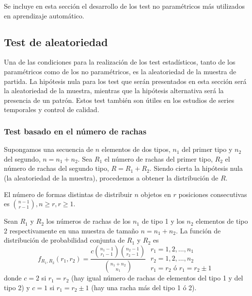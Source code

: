  	Se incluye en esta sección el desarrollo de los test no paramétricos más utilizados en aprendizaje automático.
 	
 	
\subsection{Test de aleatoriedad}

	Una de las condiciones para la realización de los test estadísticos, tanto de los paramétricos como de los no paramétricos, es la aleatoriedad de la muestra de partida. La hipótesis nula para los test que serán presentados en esta sección será la aleatoriedad de la muestra, mientras que la hipótesis alternativa será la presencia de un patrón. Estos test también son útiles en los estudios de series temporales y control de calidad.
	
\subsubsection{Test basado en el número de rachas}

	Supongamos una secuencia de $n$ elementos de dos tipos, $n_1$ del primer tipo y $n_2$ del segundo, $n = n_1 + n_2$. Sea $R_1$ el número de rachas del primer tipo, $R_2$ el número de rachas del segundo tipo, $R = R_1 + R_2$. Siendo cierta la hipótesis nula (la aleatoriedad de la muestra), procedemos a obtener la distribución de $R$.
	
\begin{lema} 
	El número de formas distintas de distribuir $n$ objetos en $r$ posiciones consecutivas es ${n-1 \choose r-1}, n \geq r, r \geq 1$.
\end{lema}

\begin{teorema}
	Sean $R_1$ y $R_2$ los números de rachas de los $n_1$ de tipo 1 y los $n_2$ elementos de tipo 2 respectivamente en una muestra de tamaño $n = n_1 + n_2$. La función de distribución de probabilidad conjunta de $R_1$ y $R_2$ es
	\[ f_{R_1,R_2} (r_1, r_2) = 
		\frac{c {n_1 - 1 \choose r_1 - 1} 
				{n_2 - 1 \choose r_2 - 1}}
			{{n_1 + n_2 \choose n_1}}\;
		\begin{array}{l}
			r_1 = 1,2, \dots, n_1 \\
			r_2 = 1,2, \dots, n_2 \\
			r_1 = r_2 \text{ ó } r_1 = r_2 \pm 1
		\end{array}
	\]
	donde $c=2$ si $r_1 = r_2$ (hay igual número de rachas de elementos del tipo 1 y del tipo 2) y $c=1$ si $r_1 = r_2 \pm 1$ (hay una racha más del tipo 1 ó 2).
\end{teorema}

